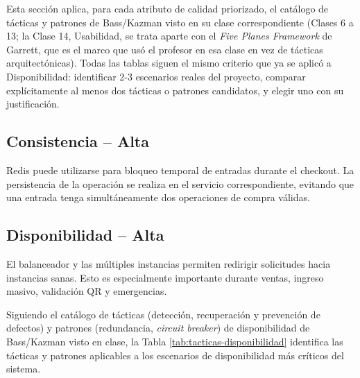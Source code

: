 \documentclass[12pt,a4paper]{article}
\begin{document}
Esta sección aplica, para cada atributo de calidad priorizado, el catálogo de tácticas y patrones
de Bass/Kazman visto en su clase correspondiente (Clases 6 a 13; la Clase 14, Usabilidad, se trata
aparte con el \textit{Five Planes Framework} de Garrett, que es el marco que usó el profesor en esa
clase en vez de tácticas arquitectónicas). Todas las tablas siguen el mismo criterio que ya se
aplicó a Disponibilidad: identificar 2-3 escenarios reales del proyecto, comparar explícitamente
al menos dos tácticas o patrones candidatos, y elegir uno con su justificación.

\subsection{Consistencia -- Alta}

Redis puede utilizarse para bloqueo temporal de entradas durante el checkout. La persistencia de la operación se realiza en el servicio correspondiente, evitando que una entrada tenga simultáneamente dos operaciones de compra válidas.

\subsection{Disponibilidad -- Alta}

El balanceador y las múltiples instancias permiten redirigir solicitudes hacia instancias sanas. Esto es especialmente importante durante ventas, ingreso masivo, validación QR y emergencias.

Siguiendo el catálogo de tácticas (detección, recuperación y prevención de defectos) y patrones (redundancia, \textit{circuit breaker}) de disponibilidad de Bass/Kazman visto en clase, la Tabla \ref{tab:tacticas-disponibilidad} identifica las tácticas y patrones aplicables a los escenarios de disponibilidad más críticos del sistema.
\end{document}
